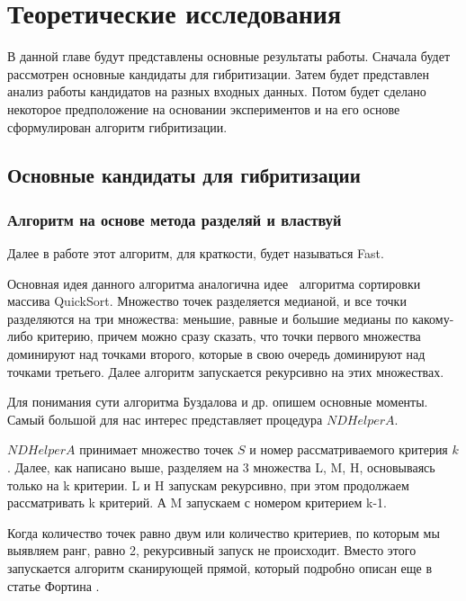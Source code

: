 \chapter{Теоретические исследования}
\label{chapter2}

В данной главе будут представлены основные результаты работы. Сначала будет рассмотрен основные кандидаты для гибритизации. Затем будет представлен анализ работы кандидатов на разных входных данных. Потом будет сделано некоторое предположение на основании экспериментов и на его основе сформулирован алгоритм гибритизации. 

\section{Основные кандидаты для гибритизации}

\subsection{Алгоритм на основе метода разделяй и властвуй}

Далее в работе этот алгоритм, для краткости, будет называться Fast.

Основная идея данного алгоритма аналогична идее алгоритма сортировки массива QuickSort. Множество точек разделяется медианой, и все точки разделяются на три множества: меньшие, равные и большие медианы по какому-либо критерию, причем можно сразу сказать, что точки первого множества доминируют над точками второго, которые в свою очередь доминируют над точками третьего. Далее алгоритм запускается рекурсивно на этих множествах.

Для понимания сути алгоритма Буздалова и др. \cite{Buzdalov} опишем основные моменты. Самый большой для нас интерес представляет процедура $NDHelperA$.

$NDHelperA$ принимает множество точек $S$ и номер рассматриваемого критерия $k$.  Далее, как написано выше, разделяем на 3 множества L, M, H, основываясь только на k критерии. L и H запускам рекурсивно, при этом продолжаем рассматривать k критерий. А M запускаем с номером критерием k-1.

Когда количество точек равно двум или количество критериев, по которым мы выявляем ранг, равно 2, рекурсивный запуск не происходит. Вместо этого запускается алгоритм сканирующей прямой, который подробно описан еще в статье Фортина \cite{Forton}. 

